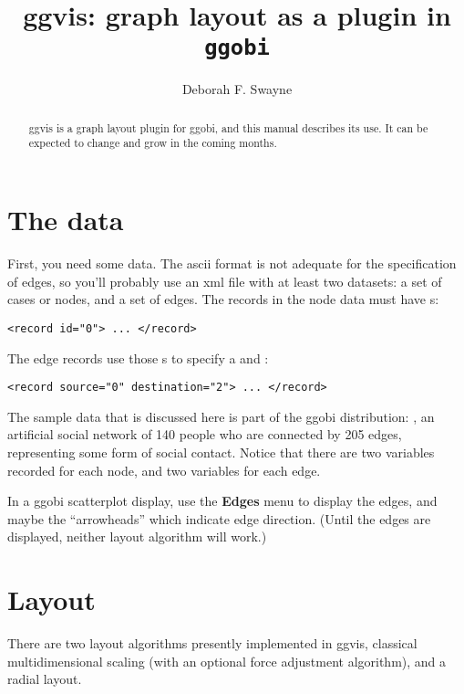 \documentclass[11pt]{article}
\begin{document}
\title{ggvis: graph layout as a plugin in {\tt ggobi}}
\author{Deborah F. Swayne}
\date{}
\maketitle

\begin{abstract}

ggvis is a graph layout plugin for ggobi, and this manual
describes its use.  It can be expected to change and grow in the
coming months.

\end{abstract}

\section{The data}

First, you need some data.  The ascii format is not adequate
for the specification of edges, so you'll probably use an xml
file with at least two datasets:  a set of cases or nodes, and
a set of edges.  The records in the node data must have
s:

\begin{verbatim}
<record id="0"> ... </record>
\end{verbatim}

The edge records use those s to specify a
 and :

\begin{verbatim}
<record source="0" destination="2"> ... </record>
\end{verbatim}

The sample data that is discussed here is part of the ggobi
distribution: , an artificial social network
of 140 people who are connected by 205 edges, representing
some form of social contact.  Notice that there are two variables
recorded for each node, and two variables for each edge.  

In a ggobi scatterplot display, use the {\bf Edges} menu to
display the edges, and maybe the ``arrowheads'' which indicate
edge direction.  (Until the edges are displayed, neither layout
algorithm will work.)

\section{Layout}

There are two layout algorithms presently implemented in ggvis,
classical multidimensional scaling (with an optional force
adjustment algorithm), and a radial layout.
\end{document}
